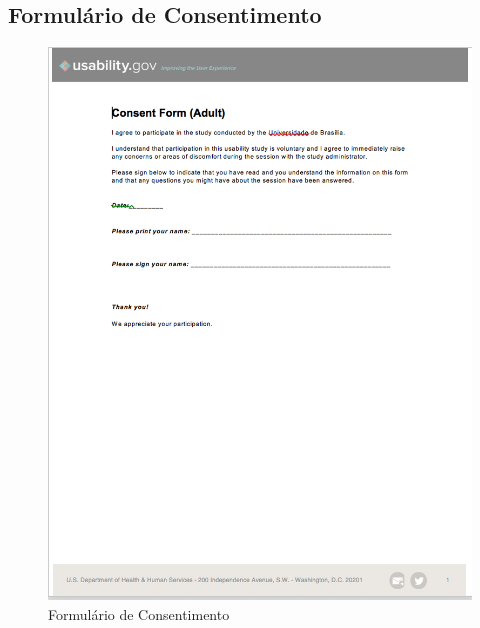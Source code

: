 \begin{apendicesenv}
\partapendices

\chapter{Formulário de Consentimento}

\graphicspath{{figuras/}}
\begin{figure}[h]
\centering
\includegraphics[scale=1.00]{consent_form.png}
\caption{Formulário de Consentimento }
\label{img:consentiment}
\end{figure}

\end{apendicesenv}
